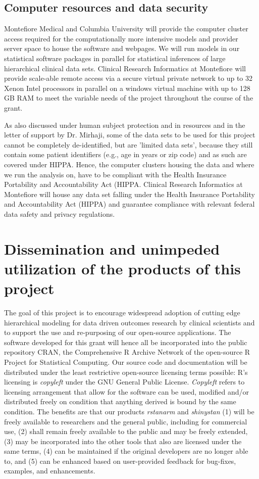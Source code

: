 \documentclass[11pt,notitlepage]{article}
\begin{document}
\subsection*{Computer resources and data security}
Montefiore Medical and Columbia University will provide the computer cluster access required for the computationally more intensive 
models and provider server space to house the software and webpages. We will run models in our statistical software packages in parallel 
for statistical inferences of large hierarchical clinical data sets. Clinical Research Informatics at Montefiore will provide scale-able 
remote access via a secure virtual private network to up to 32 Xenon Intel processors in parallel on a windows virtual machine with up to 
128 GB RAM to meet the variable needs of the project throughout the course of the grant. 

As also discussed under human subject protection and in resources and in the letter of support by Dr. Mirhaji, some of the data sets to 
be used for this project cannot be completely de-identified, but are 'limited data sets', because they still contain some patient 
identifiers (e.g., age in years or zip code) and as such are covered under HIPPA. Hence, the computer clusters housing the data and where 
we run the analysis on, have to be compliant with the Health Insurance Portability and Accountability Act (HIPPA. Clinical Research 
Informatics at Montefiore will house any data set falling under the Health Insurance Portability and Accountability Act (HIPPA) and 
guarantee compliance with relevant federal data safety and privacy regulations. 

\section*{Dissemination and unimpeded utilization of the products of this project}
The goal of this project is to encourage widespread adoption of cutting edge 
hierarchical modeling for data driven outcomes research by clinical scientists and to support the use and re-purposing of our 
open-source applications. The software developed for this grant will hence all be incorporated into the public repository CRAN, 
the Comprehensive R Archive Network of the open-source R Project for Statistical Computing. Our source code and documentation 
will be distributed under the least restrictive open-source licensing terms possible: R's licensing is \textit{copyleft} under the 
GNU General Public License. \textit{Copyleft} refers to licensing arrangement that allow for the software can be used, modified and/or 
distributed freely on condition that anything derived is bound by the same condition. The benefits  are that our products 
\textit{rstanarm} and \textit{shinystan} (1) will be freely available to researchers and the general public, including for commercial use, (2) shall remain freely available to the public and may be freely extended, (3) may be incorporated into the other tools that also are licensed under the same terms, (4) can be maintained if the original developers are no longer able to, and (5) can be enhanced based on user-provided feedback for bug-fixes, examples, and enhancements.
\end{document}

